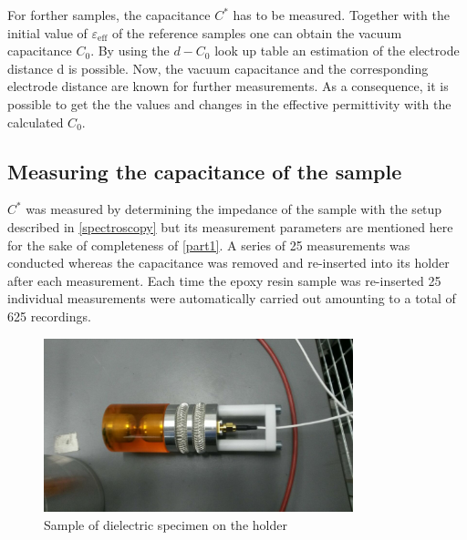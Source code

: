For forther samples, the capacitance $C^*$ has to be measured. Together with the initial value of $\varepsilon_{\textrm{eff}}$ of the reference samples one can obtain the vacuum capacitance $C_0$. By using the $d-C_0$ look up table an estimation of the electrode distance d is possible. Now, the vacuum capacitance and the corresponding electrode distance are known for further measurements. As a consequence, it is possible to get the the values and changes in the effective permittivity with the calculated $C_0$.


\subsection{Measuring the capacitance of the sample}

$C^*$ was measured by determining the impedance of the sample with the setup described in \ref{spectroscopy} but its measurement
parameters are mentioned here for the sake of completeness of \ref{part1}.
A series of 25 measurements was conducted whereas the capacitance was removed
and re-inserted into its holder after each measurement. Each time the epoxy resin sample was
re-inserted 25 individual measurements were automatically carried out amounting to a total of 625 recordings.

\begin{figure}[h!tb]
	\centering
	\includegraphics[width=0.8\textwidth]{figures/Method/Experimentaufbau/epoxy.jpg}		
	\caption[Kurze Abbildungsbeschreibung]{Sample of dielectric specimen on the holder} \label{fig.comsol_beispiel}

\end{figure}


